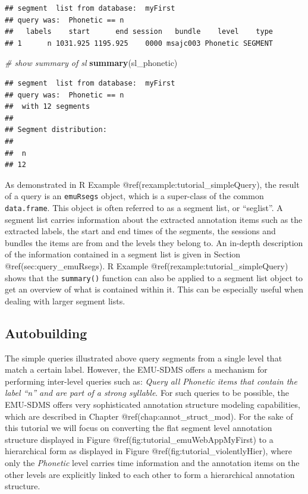 \documentclass[]{book}
\newenvironment{Shaded}{\begin{snugshade}}{\end{snugshade}}
\newcommand{\KeywordTok}[1]{\textcolor[rgb]{0.13,0.29,0.53}{\textbf{{#1}}}}
\newcommand{\CommentTok}[1]{\textcolor[rgb]{0.56,0.35,0.01}{\textit{{#1}}}}
\newcommand{\NormalTok}[1]{{#1}}
\theoremstyle{definition}
\theoremstyle{definition}
\theoremstyle{definition}
\theoremstyle{remark}
\begin{document}
\begin{verbatim}
## segment  list from database:  myFirst 
## query was:  Phonetic == n 
##   labels    start      end session   bundle    level    type
## 1      n 1031.925 1195.925    0000 msajc003 Phonetic SEGMENT
\end{verbatim}

\begin{Shaded}
\begin{Highlighting}[]
\CommentTok{# show summary of sl}
\KeywordTok{summary}\NormalTok{(sl_phonetic)}
\end{Highlighting}
\end{Shaded}

\begin{verbatim}
## segment  list from database:  myFirst 
## query was:  Phonetic == n 
##  with 12 segments
## 
## Segment distribution:
## 
##  n 
## 12
\end{verbatim}

As demonstrated in R Example @ref(rexample:tutorial\_simpleQuery), the
result of a query is an \texttt{emuRsegs} object, which is a super-class
of the common \texttt{data.frame}. This object is often referred to as a
segment list, or ``seglist''. A segment list carries information about
the extracted annotation items such as the extracted labels, the start
and end times of the segments, the sessions and bundles the items are
from and the levels they belong to. An in-depth description of the
information contained in a segment list is given in Section
@ref(sec:query\_emuRsegs). R Example
@ref(rexample:tutorial\_simpleQuery) shows that the \texttt{summary()}
function can also be applied to a segment list object to get an overview
of what is contained within it. This can be especially useful when
dealing with larger segment lists.

\subsection{Autobuilding}\label{autobuilding}

The simple queries illustrated above query segments from a single level
that match a certain label. However, the EMU-SDMS offers a mechanism for
performing inter-level queries such as: \emph{Query all Phonetic items
that contain the label ``n'' and are part of a strong syllable}. For
such queries to be possible, the EMU-SDMS offers very sophisticated
annotation structure modeling capabilities, which are described in
Chapter @ref(chap:annot\_struct\_mod). For the sake of this tutorial we
will focus on converting the flat segment level annotation structure
displayed in Figure @ref(fig:tutorial\_emuWebAppMyFirst) to a
hierarchical form as displayed in Figure
@ref(fig:tutorial\_violentlyHier), where only the \emph{Phonetic} level
carries time information and the annotation items on the other levels
are explicitly linked to each other to form a hierarchical annotation
structure.
\end{document}

